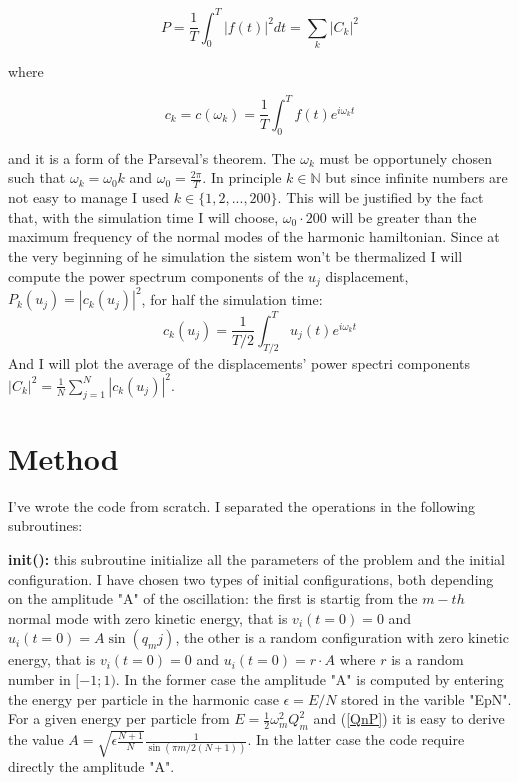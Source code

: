 \documentclass[10pt]{article}
\numberwithin{equation}{section}
\begin{document}
\begin{equation}
P= \frac{1}{T} \int_0^T | f(t)|^2 dt = \sum_k |C_k|^2
\end{equation}

where

\begin{equation}
c_k = c(\omega_k)=\frac{1}{T} \int_0^T f(t) e^{i \omega_k t}
\end{equation}

and it is a form of the Parseval's theorem. The $\omega_k$ must be opportunely chosen such that $\omega_k = \omega_0 k$ and $\omega_0 = \frac{2 \pi}{T}$. In principle $k \in \mathbb{N}$ but since infinite numbers are not easy to manage I used $k \in \{ 1,2,...,200 \} $. This will be justified by the fact that, with the simulation time I will choose, $\omega_0 \cdot 200$ will be greater than the maximum frequency of the normal modes of the harmonic hamiltonian. Since at the very beginning of he simulation the sistem won't be thermalized I will compute the power spectrum components of the $u_j$ displacement, $P_k (u_j) = |c_k (u_j)|^2$, for half the simulation time:
\begin{equation}
c_k (u_j) = \frac{1}{T/2} \int_{T/2}^T u_j(t) e^{i \omega_k t}
\end{equation}
And I will plot the average of the displacements' power spectri components $|C_k|^2 = \frac{1}{N} \sum_{j=1}^N |c_k (u_j) |^2$.

\section{Method}
I've wrote the code from scratch. I separated the operations in the following subroutines:

\textbf{init():} this subroutine initialize all the parameters of the problem and the initial configuration. I have chosen two types of initial configurations, both depending on the amplitude "A" of the oscillation: the first is startig from the $m-th$ normal mode with zero kinetic energy, that is $v_i(t=0)=0$ and $u_i(t=0) = A \sin(q_m j) $, the other is a random configuration with zero kinetic energy, that is $v_i(t=0)=0$ and $u_i(t=0) = r \cdot A$ where $r$ is a random number in $[-1;1)$. In the former case the amplitude "A" is computed by entering the energy per particle in the harmonic case $\epsilon = E/N$ stored in the varible "EpN". For a given energy per particle from $E=\frac{1}{2} \omega_m^2 Q_m^2$ and (\ref{QnP}) it is easy to derive the value $A=\sqrt{\epsilon \frac{N+1}{N}} \frac{1}{\sin (\pi m / 2(N+1) )}$. In the latter case the code require directly the amplitude "A".
\end{document}
